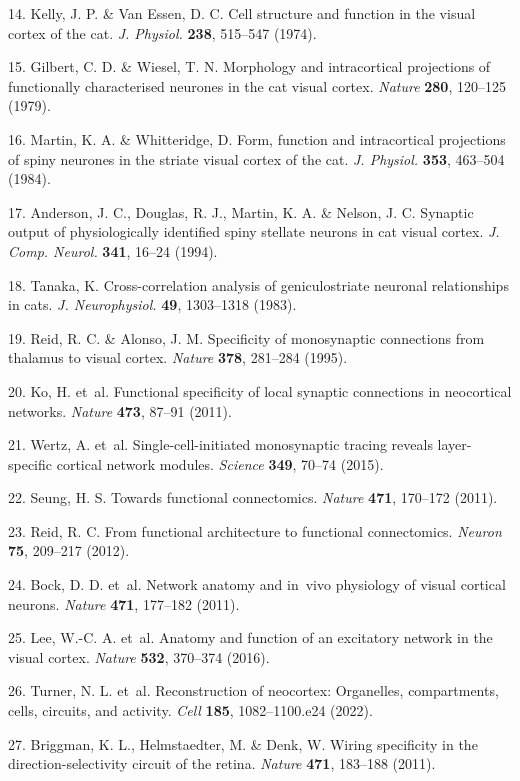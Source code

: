 \documentclass{article}
\begin{document}
\begin{hangpars}
14. Kelly, J. P. \& Van Essen, D. C. Cell structure and function in the visual cortex of the cat. \emph{J. Physiol.} \textbf{238}, 515–547 (1974). 

15. Gilbert, C. D. \& Wiesel, T. N. Morphology and intracortical projections of functionally characterised neurones in the cat visual cortex. \emph{Nature} \textbf{280}, 120–125 (1979). 

16. Martin, K. A. \& Whitteridge, D. Form, function and intracortical projections of spiny neurones in the striate visual cortex of the cat. \emph{J. Physiol.} \textbf{353}, 463–504 (1984). 

17. Anderson, J. C., Douglas, R. J., Martin, K. A. \& Nelson, J. C. Synaptic output of physiologically identified spiny stellate neurons in cat visual cortex. \emph{J. Comp. Neurol.} \textbf{341}, 16–24 (1994). 

18. Tanaka, K. Cross-correlation analysis of geniculostriate neuronal relationships in cats. \emph{J. Neurophysiol.} \textbf{49}, 1303–1318 (1983). 

19. Reid, R. C. \& Alonso, J. M. Specificity of monosynaptic connections from thalamus to visual cortex. \emph{Nature} \textbf{378}, 281–284 (1995). 

20. Ko, H. et~al. Functional specificity of local synaptic connections in neocortical networks. \emph{Nature} \textbf{473}, 87–91 (2011). 

21. Wertz, A. et~al. Single-cell-initiated monosynaptic tracing reveals layer-specific cortical network modules. \emph{Science} \textbf{349}, 70–74 (2015). 

22. Seung, H. S. Towards functional connectomics. \emph{Nature} \textbf{471}, 170–172 (2011). 

23. Reid, R. C. From functional architecture to functional connectomics. \emph{Neuron} \textbf{75}, 209–217 (2012). 

24. Bock, D. D. et~al. Network anatomy and in~vivo physiology of visual cortical neurons. \emph{Nature} \textbf{471}, 177–182 (2011). 

25. Lee, W.-C. A. et~al. Anatomy and function of an excitatory network in the visual cortex. \emph{Nature} \textbf{532}, 370–374 (2016). 

26. Turner, N. L. et~al. Reconstruction of neocortex: Organelles, compartments, cells, circuits, and activity. \emph{Cell} \textbf{185}, 1082–1100.e24 (2022). 

27. Briggman, K. L., Helmstaedter, M. \& Denk, W. Wiring specificity in the direction-selectivity circuit of the retina. \emph{Nature} \textbf{471}, 183–188 (2011). 


\end{hangpars}
\end{document}
